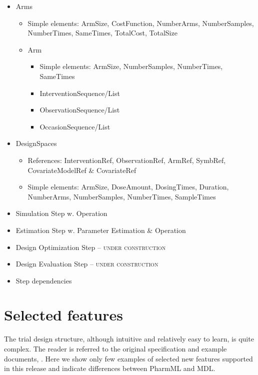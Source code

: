 \begin{minipage}{0.6\textwidth}
\begin{flushright}
\begin{itemize}
\item 
Arms
\begin{itemize}
\item 
Simple elements: ArmSize, CostFunction, NumberArms, NumberSamples, NumberTimes, SameTimes, TotalCost, TotalSize
\item 
Arm
\begin{itemize}
\item 
Simple elements: ArmSize, NumberSamples, NumberTimes, SameTimes
\item 
InterventionSequence/List
\item 
ObservationSequence/List
\item 
OccasionSequence/List
\end{itemize}
\end{itemize}
\item 
DesignSpaces
\begin{itemize}
\item 
References: InterventionRef, ObservationRef, ArmRef, SymbRef, CovariateModelRef \& CovariateRef
\item 
Simple elements: ArmSize, DoseAmount, DosingTimes, Duration, NumberArms, NumberSamples, NumberTimes, SampleTimes
\end{itemize}
\end{itemize}
\end{flushright}
{\color{red} \scshape{}}
\begin{flushleft} 
\begin{itemize}
\item 
Simulation Step w. Operation
\item 
Estimation Step w. Parameter Estimation \& Operation
\item 
Design Optimization Step -- {\color{darkgreen} \scshape{under construction}} 
\item 
Design Evaluation Step -- {\color{darkgreen} \scshape{under construction}}
\item 
Step dependencies
\end{itemize}
\end{flushleft}
\label{miniPage:comparison}
\end{minipage}



\section{Selected features}
The trial design structure, although intuitive and relatively easy to learn,
is quite complex. The reader is referred to the original specification 
and example documents, \cite{CommetsExamples2015,Commets2015}.
Here we show only few examples of selected new features supported in this 
release and indicate differences between PharmML and MDL.

